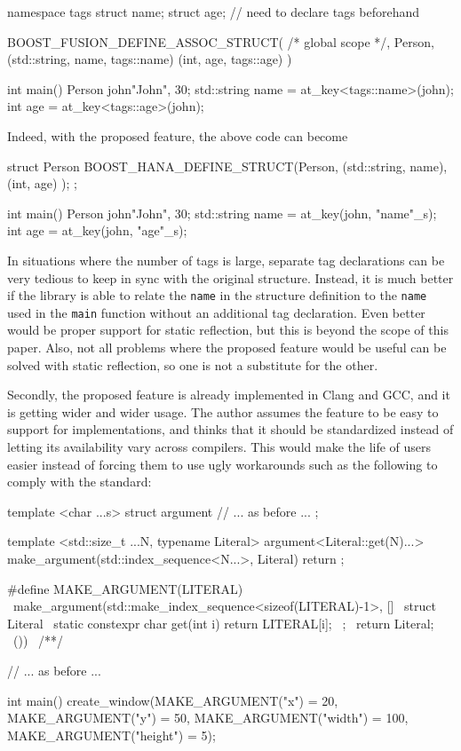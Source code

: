 \documentclass[11pt]{article}
\newcommand{\cc}[1]{\texttt{#1}}
\begin{document}
\begin{cpp}
namespace tags { struct name; struct age; } // need to declare tags beforehand

BOOST_FUSION_DEFINE_ASSOC_STRUCT(
  /* global scope */, Person,
  (std::string, name, tags::name)
  (int, age, tags::age)
)

int main() {
    Person john{"John", 30};
    std::string name = at_key<tags::name>(john);
    int age = at_key<tags::age>(john);
}
\end{cpp}

Indeed, with the proposed feature, the above code can become

\begin{cpp}
struct Person {
  BOOST_HANA_DEFINE_STRUCT(Person,
    (std::string, name),
    (int, age)
  );
};

int main() {
  Person john{"John", 30};
  std::string name = at_key(john, "name"_s);
  int age = at_key(john, "age"_s);
}
\end{cpp}

In situations where the number of tags is large, separate tag declarations can
be very tedious to keep in sync with the original structure. Instead, it is
much better if the library is able to relate the \cc{name} in the structure
definition to the \cc{name} used in the \cc{main} function without an additional
tag declaration. Even better would be proper support for static reflection, but
this is beyond the scope of this paper. Also, not all problems where the proposed
feature would be useful can be solved with static reflection, so one is not a
substitute for the other.

Secondly, the proposed feature is already implemented in Clang and GCC, and it
is getting wider and wider usage. The author assumes the feature to be easy to
support for implementations, and thinks that it should be standardized instead
of letting its availability vary across compilers. This would make the life of
users easier instead of forcing them to use ugly workarounds such as the
following to comply with the standard:

\begin{cpp}
template <char ...s>
struct argument {
  // ... as before ...
};

template <std::size_t ...N, typename Literal>
argument<Literal::get(N)...> make_argument(std::index_sequence<N...>, Literal) {
  return {};
}

#define MAKE_ARGUMENT(LITERAL)                                              \
  make_argument(std::make_index_sequence<sizeof(LITERAL)-1>{}, []{          \
    struct Literal {                                                        \
      static constexpr char get(int i) { return LITERAL[i]; }               \
    };                                                                      \
    return Literal{};                                                       \
  }())                                                                      \
/**/

// ... as before ...

int main() {
  create_window(MAKE_ARGUMENT("x") = 20, MAKE_ARGUMENT("y") = 50,
                MAKE_ARGUMENT("width") = 100, MAKE_ARGUMENT("height") = 5);
}
\end{cpp}
\end{document}
